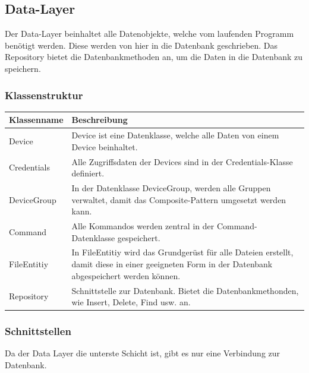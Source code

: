 \subsection{Data-Layer}
Der Data-Layer beinhaltet alle Datenobjekte, welche vom laufenden Programm benötigt werden. Diese werden von hier in die Datenbank geschrieben. Das Repository bietet die Datenbankmethoden an, um die Daten in die Datenbank zu speichern.
\subsubsection{Klassenstruktur}
\begin{table}[H]
\centering
    \begin{tabular}{@{}l p{14.1cm} @{}}\toprule    
    {Klassenname} & {Beschreibung}\\ \midrule
    Device & Device ist eine Datenklasse, welche alle Daten von einem Device beinhaltet.\\
    Credentials & Alle Zugriffsdaten der Devices sind in der Credentials-Klasse definiert. \\
    DeviceGroup & In der Datenklasse DeviceGroup, werden alle Gruppen verwaltet, damit das Composite-Pattern umgesetzt werden kann.\\
    Command & Alle Kommandos werden zentral in der Command-Datenklasse gespeichert.\\
    FileEntitiy & In FileEntitiy wird das Grundgerüst für alle Dateien erstellt, damit diese in einer geeigneten Form in der Datenbank abgespeichert werden können.\\    
    Repository & Schnittstelle zur Datenbank. Bietet die Datenbankmethonden, wie Insert, Delete, Find usw. an.\\     
    \bottomrule
    \end{tabular}
\end{table}
\subsubsection{Schnittstellen}
Da der Data Layer die unterste Schicht ist, gibt es nur eine Verbindung zur Datenbank.